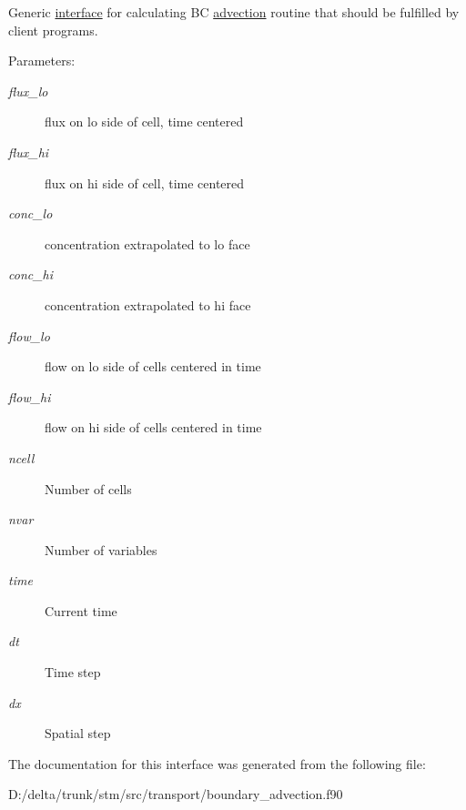 Generic \hyperlink{a00004}{interface} for calculating BC \hyperlink{a00052}{advection} routine that should be fulfilled by client programs. 

\begin{Desc}
\item[Parameters:]
\begin{description}
\item[{\em flux\_\-lo}]flux on lo side of cell, time centered\item[{\em flux\_\-hi}]flux on hi side of cell, time centered\item[{\em conc\_\-lo}]concentration extrapolated to lo face\item[{\em conc\_\-hi}]concentration extrapolated to hi face\item[{\em flow\_\-lo}]flow on lo side of cells centered in time\item[{\em flow\_\-hi}]flow on hi side of cells centered in time\item[{\em ncell}]Number of cells\item[{\em nvar}]Number of variables\item[{\em time}]Current time\item[{\em dt}]Time step \item[{\em dx}]Spatial step \end{description}
\end{Desc}


The documentation for this interface was generated from the following file:\begin{CompactItemize}
\item 
D:/delta/trunk/stm/src/transport/boundary\_\-advection.f90\end{CompactItemize}
